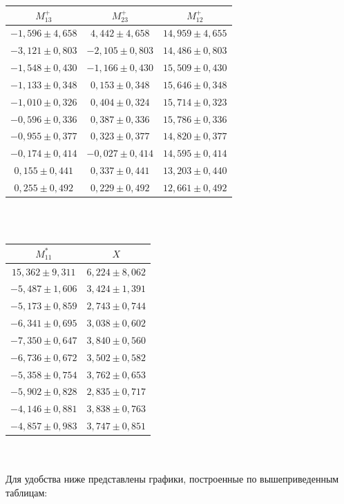 \documentclass[14pt]{article} %
\begin{document}
\begin{tabular}{|c|c|c|}
\hline
$M_{13}^+$&$M_{23}^+$&$M_{12}^+$\\
\hline
$-1,596	\pm	4,658	$&$	4,442	\pm	4,658	$&$	14,959	\pm	4,655	$\\
$-3,121	\pm	0,803	$&$	-2,105	\pm	0,803	$&$	14,486	\pm	0,803	$\\
$-1,548	\pm	0,430	$&$	-1,166	\pm	0,430	$&$	15,509	\pm	0,430	$\\
$-1,133	\pm	0,348	$&$	0,153	\pm	0,348	$&$	15,646	\pm	0,348	$\\
$-1,010	\pm	0,326	$&$	0,404	\pm	0,324	$&$	15,714	\pm	0,323	$\\
$-0,596	\pm	0,336	$&$	0,387	\pm	0,336	$&$	15,786	\pm	0,336	$\\
$-0,955	\pm	0,377	$&$	0,323	\pm	0,377	$&$	14,820	\pm	0,377	$\\
$-0,174	\pm	0,414	$&$	-0,027	\pm	0,414	$&$	14,595	\pm	0,414	$\\
$0,155	\pm	0,441	$&$	0,337	\pm	0,441	$&$	13,203	\pm	0,440	$\\
$0,255	\pm	0,492	$&$	0,229	\pm	0,492	$&$	12,661	\pm	0,492	$\\
\hline
\end{tabular}\\\\
\begin{tabular}{|c|c|}
\hline
$M_{11}^*$&$X$\\
\hline
$	15,362	\pm	9,311	$&$	6,224	\pm	8,062$\\
$	-5,487	\pm	1,606	$&$	3,424	\pm	1,391$\\
$	-5,173	\pm	0,859	$&$	2,743	\pm	0,744$\\
$	-6,341	\pm	0,695	$&$	3,038	\pm	0,602$\\
$	-7,350	\pm	0,647	$&$	3,840	\pm	0,560$\\
$	-6,736	\pm	0,672	$&$	3,502	\pm	0,582$\\
$	-5,358	\pm	0,754	$&$	3,762	\pm	0,653$\\
$	-5,902	\pm	0,828	$&$	2,835	\pm	0,717$\\
$	-4,146	\pm	0,881	$&$	3,838	\pm	0,763$\\
$	-4,857	\pm	0,983	$&$	3,747	\pm	0,851$\\
\hline
\end{tabular}\\\\
Для удобства ниже представлены графики, построенные по вышеприведенным таблицам:
\end{document}
